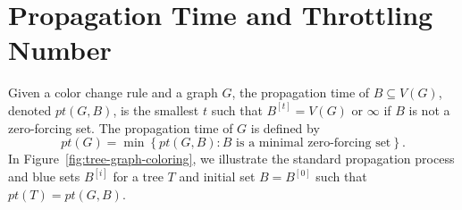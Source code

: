 \documentclass{article}
\theoremstyle{definition}
\begin{document}
\section{Propagation Time and Throttling Number}
Given a color change rule and a graph $G$, the propagation time of $B\subseteq V(G)$, denoted $pt(G,B)$, is the smallest $t$ such that $B^{[t]}=V(G)$ or $\infty$ if $B$ is not a zero-forcing set.
The propagation time of $G$ is defined by
\[
pt(G) = \min\left\{pt(G,B)\colon\text{$B$ is a minimal zero-forcing set}\right\}.
\]
In Figure~\ref{fig:tree-graph-coloring}, we illustrate the standard propagation process and blue sets $B^{[i]}$ for a tree $T$ and initial set $B=B^{[0]}$ such that $pt(T) = pt(G,B)$.
\end{document}
